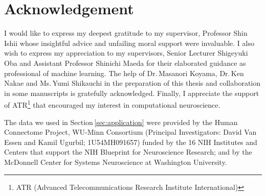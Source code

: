 \section{Acknowledgement}
%
I would like to express my deepest gratitude to my supervisor, Professor Shin Ishii whose
insightful advice and unfailing moral support were invaluable.
I also wish to express my appreciation to my supervisors,
Senior Lecturer Shigeyuki Oba and Assistant Professor Shinichi Maeda
for their elaborated guidance as professional of machine learning.
The help of Dr.\,Masanori Koyama, Dr.\,Ken Nakae and Ms.\,Yumi Shikauchi
in the preparation of this thesis and collaboration in some manuscripts \cite{Koyamada2014a,Koyamada2014b,Koyamada2015}
is gratefully acknowledged.
Finally, I appreciate the support of ATR\footnote{ATR (Advanced
Telecommunications Research Institute International)} that encouraged my interest in
computational neuroscience.

The data we used in Section\,\ref{sec:application} were provided by the Human Connectome Project,
WU-Minn Consortium
(Principal Investigators: David Van Essen and Kamil Ugurbil;
1U54MH091657) funded by the 16 NIH Institutes and Centers that support
the NIH Blueprint for Neuroscience Research; and by the McDonnell Center
for Systems Neuroscience at Washington University.
